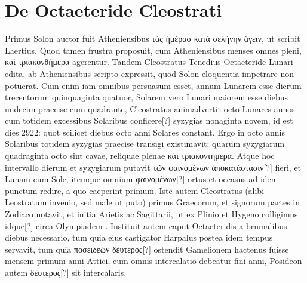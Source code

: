\section{De Octaeteride Cleostrati}
%
Primus Solon auctor fuit Atheniensibus
 \textgreek{τὰς ἡμέρασ κατὰ σελήνην
ἄγειν}, ut scribit Laertius.
Quod tamen frustra proposuit, cum
Atheniensibus menses omnes pleni, \textgreek{καὶ τριακονθήμερα} agerentur.
Tandem Cleostratus Tenedius Octaeteride Lunari edita, ab Atheniensibus
scripto expressit, quod Solon eloquentia impetrare non potuerat.
Cum enim iam omnibus persuasum esset, annum Lunarem esse dierum
trecentorum quinquaginta quatuor, Solarem vero Lunari maiorem
esse diebus undecim praecise cum quadrante, Cleostratus animadvertit
octo Lunares annos cum totidem excessibus Solaribus conficere[?] syzygias
nonaginta novem, id est dies 2922: quot scilicet diebus octo anni
Solares constant.
Ergo in octo annis Solaribus totidem syzygias praecise
transigi existimavit: quarum syzygiarum quadraginta octo sint
cavae, reliquae plenae \textgreek{κὰι τριακοντήμερα}.
Atque hoc intervallo dierum
et syzygiarum putavit \textgreek{τῶν φαινομένων ἀποκατάστασιν[?]} fieri,
 et Lunam
cum Sole, itemque omnium \textgreek{φαινομένων[?]}
 ortus et occasus ad idem punctum
redire, a quo caeperint primum.
Iste autem Cleostratus (alibi
Leostratum invenio, sed male ut puto) primus Graecorum, et signorum
partes in Zodiaco notavit, et initia Arietis ac Sagittarii, ut ex Plinio
et Hygeno colligimus: idque[?] circa Olympiadem .
Instituit
autem caput Octaeteridis a brumalibus diebus necessario, tum quia
eius castigator Harpalus postea idem tempus servavit, tum quia
 \textgreek{ποσειδεῲν δέυτερος[?]}
ostendit Gamelionem hactenus fuisse mensem primum
anni Attici, cum omnis intercalatio debeatur fini anni, Posideon autem
\textgreek{δέυτερος[?]} sit intercalaris.
